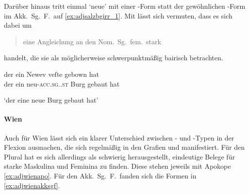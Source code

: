 Darüber hinaus tritt einmal  `neue' mit einer -Form
statt der gewöhnlichen -Form im Akk.\ Sg.\ F.\ auf
\cref{ex:adjsalzbgirr_1}. Mit \citet{ksw2} lässt sich vermuten, dass es sich
dabei um \blockcquote[270]{ksw2}{\mbox{eine} Angleichung an den
Nom.~Sg.~fem.~stark} handelt, die sie als möglicherweise schwerpunktmäßig
bairisch betrachten.

\begin{exe}
	\ex \label{ex:adjsalzbgirr_1}
		\gll der ein Newev veſte gebown hat \\
			der ein neu-\textsc{acc.sg.\FemI.st} Burg gebaut hat \\
		\begin{taggedline}{\parencites(Salzburg, um 1285)[\pno~695, 103.11]{cao2}}
		\trans `der eine neue Burg gebaut hat'
		\end{taggedline}
\end{exe}

\paragraph{Wien}
\label{par:adjwien}
Auch für Wien lässt sich ein klarer Unterschied zwischen - und
-Typen in der Flexion ausmachen, die sich regelmäßig in den Grafien
 und  manifestiert. Für den Plural hat es sich
allerdings als schwierig herausgestellt, eindeutige Belege für starke Maskulina
und Feminina zu finden. Diese stehen jeweils mit Apokope \cref{ex:adjwienapo}.
Für den Akk.\ Sg.\ F.\ fanden sich die Formen in \cref{ex:adjwienakksgf}.

